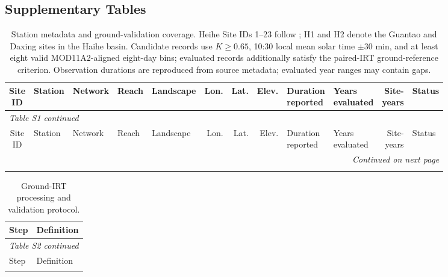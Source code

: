 \documentclass[11pt,a4paper]{article}
\begin{document}
\clearpage
\begin{landscape}
\section*{Supplementary Tables}
\scriptsize
\setlength{\tabcolsep}{2.4pt}
\renewcommand{\arraystretch}{1.12}
\begin{longtable}{@{}c p{2.8cm} p{1.1cm} p{1.35cm} p{2.35cm} r r r p{3.35cm} p{1.25cm} r p{1.95cm}@{}}
\caption{Station metadata and ground-validation coverage. Heihe Site IDs 1--23 follow \textcite{liu2018heiheNetwork}; H1 and H2 denote the Guantao and Daxing sites in the Haihe basin. Candidate records use $K\geq0.65$, 10:30 local mean solar time $\pm30$ min, and at least eight valid MOD11A2-aligned eight-day bins; evaluated records additionally satisfy the paired-IRT ground-reference criterion. Observation durations are reproduced from source metadata; evaluated year ranges may contain gaps.}\label{tab:s1-stations}\\
\toprule
\shortstack{Site\\ID} & Station & Network & Reach & Landscape & Lon. & Lat. & Elev. & \shortstack{Duration\\reported} & \shortstack{Years\\evaluated} & \shortstack{Site-\\years} & Status \\
\midrule
\endfirsthead
\multicolumn{12}{l}{\textit{Table S1 continued}}\\
\toprule
\shortstack{Site\\ID} & Station & Network & Reach & Landscape & Lon. & Lat. & Elev. & \shortstack{Duration\\reported} & \shortstack{Years\\evaluated} & \shortstack{Site-\\years} & Status \\
\midrule
\endhead
\midrule
\multicolumn{12}{r}{\textit{Continued on next page}}\\
\endfoot
\bottomrule
\endlastfoot

\end{longtable}
\end{landscape}

\begin{longtable}{@{}p{3.4cm}p{12.0cm}@{}}
\caption{Ground-IRT processing and validation protocol.}\label{tab:s2-protocol}\\
\toprule
Step & Definition \\
\midrule
\endfirsthead
\multicolumn{2}{l}{\textit{Table S2 continued}}\\
\toprule
Step & Definition \\
\midrule
\endhead
\bottomrule
\endfoot

\end{longtable}
\end{document}
